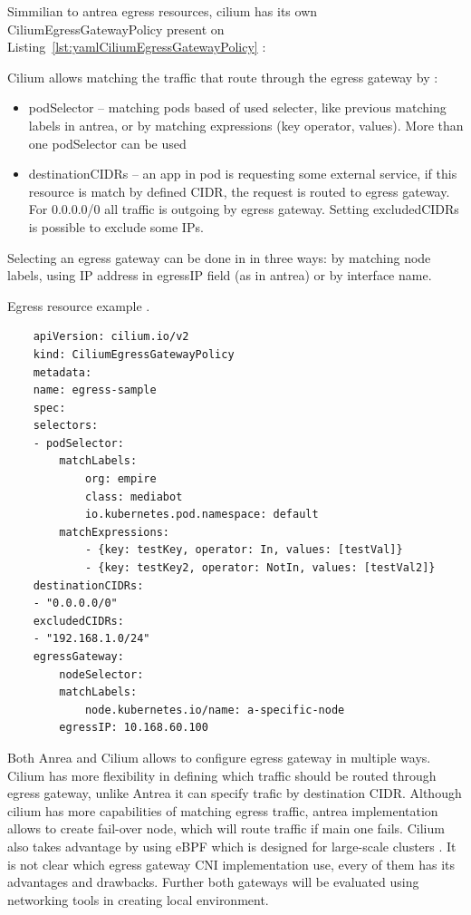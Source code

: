 Simmilian to antrea egress resources, cilium has its own CiliumEgressGatewayPolicy present on Listing~\ref{lst:yamlCiliumEgressGatewayPolicy} \cite{CiliumEgressGateway}:

Cilium allows matching the traffic that route through the egress gateway by \cite{CiliumEgressGateway}:
\begin{itemize}
    \item podSelector -- matching pods based of used selecter, like previous matching labels in antrea, or by matching expressions (key operator, values). More than one podSelector can be used
    \item destinationCIDRs -- an app in pod is requesting some external service, if this resource is match by defined CIDR, the request is routed to egress gateway. For 0.0.0.0/0 all traffic is outgoing by egress gateway. Setting excludedCIDRs is possible to exclude some IPs.
\end{itemize}

Selecting an egress gateway can be done in in three ways: by matching node labels, using IP address in egressIP field (as in antrea) or by interface name. 

\begin{listing}[htb]
    \centering
    \caption{Egress resource example \cite{AntreaEgressArch}.}
    \begin{verbatim}
    apiVersion: cilium.io/v2
    kind: CiliumEgressGatewayPolicy
    metadata:
    name: egress-sample
    spec:
    selectors:
    - podSelector:
        matchLabels:
            org: empire
            class: mediabot
            io.kubernetes.pod.namespace: default
        matchExpressions:
            - {key: testKey, operator: In, values: [testVal]}
            - {key: testKey2, operator: NotIn, values: [testVal2]}
    destinationCIDRs:
    - "0.0.0.0/0"
    excludedCIDRs:
    - "192.168.1.0/24"
    egressGateway:
        nodeSelector:
        matchLabels:
            node.kubernetes.io/name: a-specific-node
        egressIP: 10.168.60.100
    \end{verbatim}
    \label{lst:yamlCiliumEgressGatewayPolicy}
\end{listing}


Both Anrea and Cilium allows to configure egress gateway in multiple ways. Cilium has more flexibility in defining which traffic should be routed through egress gateway, unlike Antrea it can specify trafic by destination CIDR. Although cilium has more capabilities of matching egress traffic, antrea implementation allows to create fail-over node, which will route traffic if main one fails. Cilium also takes advantage by using eBPF which is designed for large-scale clusters \cite{CiliumOverview}. It is not clear which egress gateway CNI implementation use, every of them has its advantages and drawbacks. Further both gateways will be evaluated using networking tools in creating local environment.




